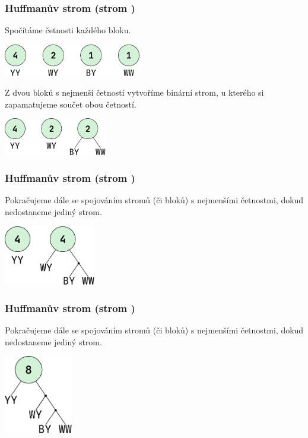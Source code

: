 \documentclass[aspectratio=169,11pt,svgnames]{beamer}
\begin{document}
\begin{frame}
 \frametitle{Huffmanův strom (strom )}
 Spočítáme četnosti každého bloku.
 \begin{center}
  \includegraphics[width=6cm]{tree-1.pdf}
  \vspace*{-.5em}
 \end{center}
 \pause
 Z dvou bloků s nejmenší četností vytvoříme binární strom, u kterého si
 zapamatujeme součet obou četností.
 \begin{center}
  \includegraphics[width=4.5cm]{tree-2.pdf}
  \vspace*{-.5em}
 \end{center}
\end{frame}

\begin{frame}
 \frametitle{Huffmanův strom (strom )}
 Pokračujeme dále se spojováním stromů (či bloků) s nejmenšími četnostmi, dokud
 nedostaneme jediný strom.
 \begin{center}
  \includegraphics[width=4cm]{tree-3.pdf}
  \vspace*{-.5em}
 \end{center}
\end{frame}

\begin{frame}
 \frametitle{Huffmanův strom (strom )}
 Pokračujeme dále se spojováním stromů (či bloků) s nejmenšími četnostmi, dokud
 nedostaneme jediný strom.
 \begin{center}
  \includegraphics[width=3cm]{tree-4.pdf}
  \vspace*{-.5em}
 \end{center}
\end{frame}
\end{document}
